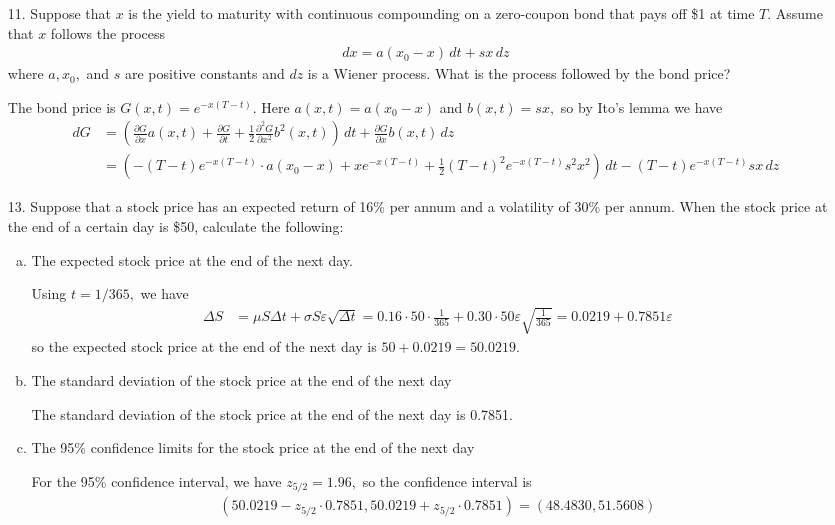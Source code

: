 \documentclass{article}
\begin{document}
\begin{itemize}
	\item[11.] Suppose that $x$ is the yield to maturity with continuous compounding on a zero-coupon bond that pays off \$1 at time $T.$ Assume that $x$ follows the process
		\begin{align*}
			dx = a(x_0-x)\, dt + sx\, dz
		\end{align*}
		where $a, x_0,$ and $s$ are positive constants and $dz$ is a Wiener process. What is the process followed by the bond price?
		\begin{soln}
			The bond price is $G(x, t)=e^{-x(T-t)}.$ Here $a(x, t)=a(x_0-x)$ and $b(x, t)=sx,$ so by Ito's lemma we have
			\begin{align*}
				dG &= \left( \frac{\partial G}{\partial x}a(x, t) + \frac{\partial G}{\partial t} + \frac{1}{2}\frac{\partial^2 G}{\partial x^2}b^2(x, t) \right)\, dt + \frac{\partial G}{\partial x}b(x, t)\, dz \\
				&= \left( -(T-t)e^{-x(T-t)}\cdot a(x_0-x) + xe^{-x(T-t)} + \frac{1}{2}(T-t)^2 e^{-x(T-t)}s^2x^2 \right)\, dt - (T-t)e^{-x(T-t)}sx\, dz
			\end{align*}
		\end{soln}

	\item[13.] Suppose that a stock price has an expected return of 16\% per annum and a volatility of 30\% per annum. When the stock price at the end of a certain day is \$50, calculate the following:
		\begin{enumerate}[(a)]
			\item The expected stock price at the end of the next day.
				\begin{soln}
					Using $t=1/365,$ we have
					\begin{align*}
						\Delta S &= \mu S\Delta t + \sigma S\varepsilon\sqrt{\Delta t} = 0.16\cdot 50\cdot \frac{1}{365} + 0.30\cdot 50 \varepsilon\sqrt{\frac{1}{365}} = 0.0219 + 0.7851\varepsilon
					\end{align*}
					so the expected stock price at the end of the next day is $50+0.0219=50.0219.$
				\end{soln}

			\item The standard deviation of the stock price at the end of the next day
				\begin{soln}
					The standard deviation of the stock price at the end of the next day is 0.7851.
				\end{soln}

			\item The 95\% confidence limits for the stock price at the end of the next day
				\begin{soln}
					For the 95\% confidence interval, we have $z_{5/2}=1.96,$ so the confidence interval is
					\begin{align*}
						(50.0219-z_{5/2}\cdot 0.7851, 50.0219 + z_{5/2}\cdot 0.7851) = (48.4830, 51.5608)
					\end{align*}
				\end{soln}
				
		\end{enumerate}
		
\end{itemize}
\end{document}
